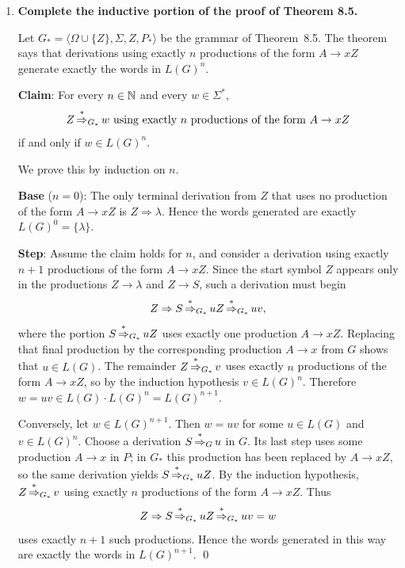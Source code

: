 \begin{enumerate}[{8.}1. ]
Now apply the claim with $A=S$. Any terminal derivation in $G^0$ either is
$Z\Rightarrow\lambda$ (which occurs exactly when $S\to\lambda\in P$) or begins
$Z\Rightarrow S$ and then follows a derivation covered by the claim. Hence
$L(G^0)=L(G)$. \qed

\item \textbf{Complete the inductive portion of the proof of Theorem 8.5.}

Let $G_*=\langle\Omega\cup\{Z\},\Sigma,Z,P_*\rangle$ be the grammar of
Theorem~8.5. The theorem says that derivations using exactly $n$ productions of
the form $A\to xZ$ generate exactly the words in $L(G)^n$.

\textbf{Claim}: For every $n\in\mathbb{N}$ and every $w\in\Sigma^*$,
\[
Z\operatorname{\overset{*}{\Rightarrow}}_{G_*} w \text{ using exactly $n$ productions of the form }
A\to xZ
\]
if and only if $w\in L(G)^n$.

We prove this by induction on $n$.

\textbf{Base} ($n=0$): The only terminal derivation from $Z$ that uses no
production of the form $A\to xZ$ is $Z\Rightarrow\lambda$. Hence the words
generated are exactly $L(G)^0=\{\lambda\}$.

\textbf{Step}: Assume the claim holds for $n$, and consider a derivation using
exactly $n+1$ productions of the form $A\to xZ$. Since the start symbol $Z$
appears only in the productions $Z\to\lambda$ and $Z\to S$, such a derivation
must begin
\[
Z\Rightarrow S\operatorname{\overset{*}{\Rightarrow}}_{G_*} uZ\operatorname{\overset{*}{\Rightarrow}}_{G_*} uv,
\]
where the portion $S\operatorname{\overset{*}{\Rightarrow}}_{G_*} uZ$ uses exactly one production
$A\to xZ$. Replacing that final production by the corresponding production
$A\to x$ from $G$ shows that $u\in L(G)$. The remainder
$Z\operatorname{\overset{*}{\Rightarrow}}_{G_*} v$ uses exactly $n$ productions of the form $A\to xZ$, so
by the induction hypothesis $v\in L(G)^n$. Therefore
$w=uv\in L(G)\cdot L(G)^n=L(G)^{n+1}$.

Conversely, let $w\in L(G)^{n+1}$. Then $w=uv$ for some
$u\in L(G)$ and $v\in L(G)^n$. Choose a derivation $S\operatorname{\overset{*}{\Rightarrow}}_G u$ in $G$.
Its last step uses some production $A\to x$ in $P$; in $G_*$ this production
has been replaced by $A\to xZ$, so the same derivation yields
$S\operatorname{\overset{*}{\Rightarrow}}_{G_*} uZ$. By the induction hypothesis,
$Z\operatorname{\overset{*}{\Rightarrow}}_{G_*} v$ using exactly $n$ productions of the form $A\to xZ$.
Thus
\[
Z\Rightarrow S\operatorname{\overset{*}{\Rightarrow}}_{G_*} uZ\operatorname{\overset{*}{\Rightarrow}}_{G_*} uv=w
\]
uses exactly $n+1$ such productions. Hence the words generated in this way are
exactly the words in $L(G)^{n+1}$. \qed


\end{enumerate}
